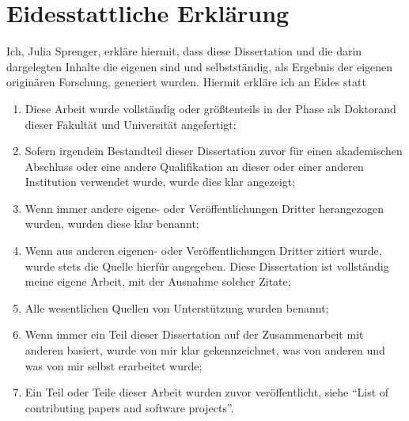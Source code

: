 \cleardoublepage
\thispagestyle{empty}

\section*{Eidesstattliche Erkl\"arung}
\label{sec:SOOA}

Ich, Julia Sprenger, erkläre hiermit, dass diese Dissertation und die darin dargelegten Inhalte die eigenen sind und selbstständig, als Ergebnis der eigenen originären Forschung, generiert wurden. Hiermit erkläre ich an Eides statt

\begin{enumerate}
 \item Diese Arbeit wurde vollständig oder größtenteils in der Phase als Doktorand dieser Fakultät und Universität angefertigt;
 \item Sofern irgendein Bestandteil dieser Dissertation zuvor für einen akademischen Abschluss oder eine andere Qualifikation an dieser oder einer anderen Institution verwendet wurde, wurde dies klar angezeigt;
 \item Wenn immer andere eigene- oder Veröffentlichungen Dritter herangezogen wurden, wurden diese klar benannt;
 \item Wenn aus anderen eigenen- oder Veröffentlichungen Dritter zitiert wurde, wurde stets die Quelle hierfür angegeben. Diese Dissertation ist vollständig meine eigene Arbeit, mit der Ausnahme solcher Zitate;
 \item Alle wesentlichen Quellen von Unterstützung wurden benannt;
 \item Wenn immer ein Teil dieser Dissertation auf der Zusammenarbeit mit anderen basiert, wurde von mir klar gekennzeichnet, was von anderen und was von mir selbst erarbeitet wurde;
 \item Ein Teil oder Teile dieser Arbeit wurden zuvor veröffentlicht, siehe ``List of contributing papers and software projects''.\\
\end{enumerate}


